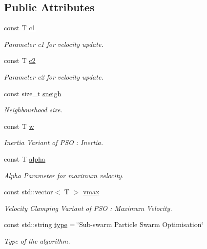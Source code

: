 \subsection*{Public Attributes}
\begin{DoxyCompactItemize}
\item 
const T \hyperlink{structea_1_1_p_s_os_ad714859d3155b4492fb01eb1664e7c65}{c1}
\begin{DoxyCompactList}\small\item\em Parameter c1 for velocity update. \end{DoxyCompactList}\item 
const T \hyperlink{structea_1_1_p_s_os_a905b431f08e1617a0e30bdac1093927b}{c2}
\begin{DoxyCompactList}\small\item\em Parameter c2 for velocity update. \end{DoxyCompactList}\item 
const size\+\_\+t \hyperlink{structea_1_1_p_s_os_a60d85bb8fdc3913239c5769906c3f917}{sneigh}
\begin{DoxyCompactList}\small\item\em Neighbourhood size. \end{DoxyCompactList}\item 
const T \hyperlink{structea_1_1_p_s_os_a31794d89fb98ef9f4e887458c0982982}{w}
\begin{DoxyCompactList}\small\item\em Inertia Variant of P\+SO \+: Inertia. \end{DoxyCompactList}\item 
const T \hyperlink{structea_1_1_p_s_os_ae12721e5571bed1300a16dac83ab27cc}{alpha}
\begin{DoxyCompactList}\small\item\em Alpha Parameter for maximum velocity. \end{DoxyCompactList}\item 
const std\+::vector$<$ T $>$ \hyperlink{structea_1_1_p_s_os_a58dfadd4951b668607176b290a18c1fa}{vmax}
\begin{DoxyCompactList}\small\item\em Velocity Clamping Variant of P\+SO \+: Maximum Velocity. \end{DoxyCompactList}\item 
const std\+::string \hyperlink{structea_1_1_p_s_os_a70f9529943125d7f2811961e1d25b30b}{type} = \char`\"{}Sub-\/swarm Particle Swarm Optimisation\char`\"{}
\begin{DoxyCompactList}\small\item\em Type of the algorithm. \end{DoxyCompactList}\end{DoxyCompactItemize}
